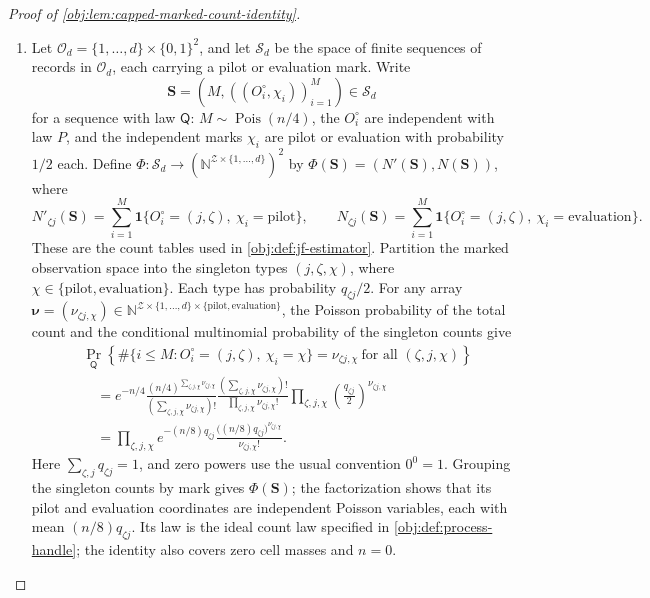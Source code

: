 \documentclass[11pt]{article}
\begin{document}
\begin{proof}[Proof of \cref{obj:lem:capped-marked-count-identity}]
\begin{enumerate}
\item Let \(\mathcal O_d=\{1,\ldots,d\}\times\{0,1\}^2\), and let \(\mathcal S_d\) be the space of finite sequences of records in \(\mathcal O_d\), each carrying a pilot or evaluation mark. Write
\[
\mathbf S=(M,((O_i^\circ,\chi_i))_{i=1}^M)\in\mathcal S_d
\]
for a sequence with law \(\mathsf Q\): \(M\sim\operatorname{Pois}(n/4)\), the \(O_i^\circ\) are independent with law \(P\), and the independent marks \(\chi_i\) are pilot or evaluation with probability \(1/2\) each. Define \(\Phi:\mathcal S_d\to(\mathbb N^{\mathcal Z\times\{1,\ldots,d\}})^2\) by \(\Phi(\mathbf S)=(N'(\mathbf S),N(\mathbf S))\), where
\[
N'_{\zeta j}(\mathbf S)
=\sum_{i=1}^M\mathbf1\{O_i^\circ=(j,\zeta),\ \chi_i=\mathrm{pilot}\},
\qquad
N_{\zeta j}(\mathbf S)
=\sum_{i=1}^M\mathbf1\{O_i^\circ=(j,\zeta),\ \chi_i=\mathrm{evaluation}\}.
\]
These are the count tables used in \cref{obj:def:jf-estimator}. Partition the marked observation space into the singleton types \((j,\zeta,\chi)\), where \(\chi\in\{\mathrm{pilot},\mathrm{evaluation}\}\). Each type has probability \(q_{\zeta j}/2\). For any array \(\boldsymbol\nu=(\nu_{\zeta j,\chi})\in\mathbb N^{\mathcal Z\times\{1,\ldots,d\}\times\{\mathrm{pilot},\mathrm{evaluation}\}}\), the Poisson probability of the total count and the conditional multinomial probability of the singleton counts give
\[
\begin{aligned}
&\Pr_{\mathsf Q}\!\left\{
\#\{i\leq M:O_i^\circ=(j,\zeta),\ \chi_i=\chi\}
=\nu_{\zeta j,\chi}\ \text{for all }(\zeta,j,\chi)\right\}\\
&\quad=e^{-n/4}
\frac{(n/4)^{\sum_{\zeta,j,\chi}\nu_{\zeta j,\chi}}}
{\left(\sum_{\zeta,j,\chi}\nu_{\zeta j,\chi}\right)!}
\frac{\left(\sum_{\zeta,j,\chi}\nu_{\zeta j,\chi}\right)!}
{\prod_{\zeta,j,\chi}\nu_{\zeta j,\chi}!}
\prod_{\zeta,j,\chi}\left(\frac{q_{\zeta j}}2\right)^{\nu_{\zeta j,\chi}}\\
&\quad=\prod_{\zeta,j,\chi}
 e^{-(n/8)q_{\zeta j}}
 \frac{\bigl((n/8)q_{\zeta j}\bigr)^{\nu_{\zeta j,\chi}}}
 {\nu_{\zeta j,\chi}!}.
\end{aligned}
\]
Here \(\sum_{\zeta,j}q_{\zeta j}=1\), and zero powers use the usual convention \(0^0=1\). Grouping the singleton counts by mark gives \(\Phi(\mathbf S)\); the factorization shows that its pilot and evaluation coordinates are independent Poisson variables, each with mean \((n/8)q_{\zeta j}\). Its law is the ideal count law specified in \cref{obj:def:process-handle}; the identity also covers zero cell masses and \(n=0\).


\end{enumerate}
\end{proof}
\end{document}
